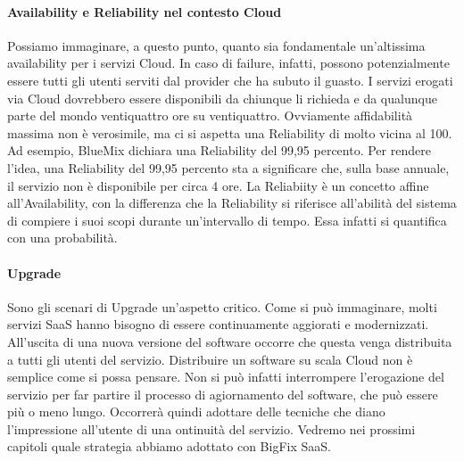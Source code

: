 \paragraph{Availability e Reliability nel contesto Cloud}
Possiamo immaginare, a questo punto, quanto sia fondamentale un'altissima availability per i servizi Cloud. In caso di failure, infatti, possono potenzialmente essere tutti gli utenti serviti dal provider che ha subuto il guasto. I servizi erogati via Cloud dovrebbero essere disponibili da chiunque li richieda e da qualunque parte del mondo ventiquattro ore su ventiquattro. Ovviamente affidabilità massima non è verosimile, ma ci si aspetta una Reliability di molto vicina al 100. Ad esempio, BlueMix dichiara una Reliability del 99,95 percento. Per rendere l'idea, una Reliability del 99,95 percento sta a significare che, sulla base annuale, il servizio non è disponibile per circa 4 ore. La Reliabiity è un concetto affine all'Availability, con la differenza che la Reliability si riferisce all'abilità del sistema di compiere i suoi scopi durante un'intervallo di tempo. Essa infatti si quantifica con una probabilità.

\paragraph{Upgrade}
Sono gli scenari di Upgrade un'aspetto critico. Come si può immaginare, molti servizi SaaS hanno bisogno di essere continuamente aggiorati e modernizzati. All'uscita di una nuova versione del software occorre che questa venga distribuita a tutti gli utenti del servizio. Distribuire un software su scala Cloud non è semplice come si possa pensare. Non si può infatti interrompere l'erogazione del servizio per far partire il processo di agiornamento del software, che può essere più o meno lungo. Occorrerà quindi adottare delle tecniche che diano l'impressione all'utente di una ontinuità del servizio. Vedremo nei prossimi capitoli quale strategia abbiamo adottato con BigFix SaaS. 


